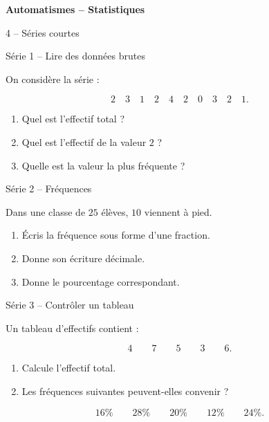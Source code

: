 \documentclass[aspectratio=169,11pt]{beamer}
\newcommand{\serie}[2]{%
\begin{frame}[t]{#1}
\vspace{0.25cm}
#2
\end{frame}
}
\begin{document}
\begin{frame}[plain]
\vfill
\centering
{\Huge\bfseries\color{TitreC} Automatismes -- Statistiques\par}
\vspace{0.5cm}
{\Large\color{SavoirC}4\ieme{} -- Séries courtes}
\vfill
\end{frame}

\serie{Série 1 -- Lire des données brutes}{

On considère la série :

\[
2\quad3\quad1\quad2\quad4\quad2\quad0\quad3\quad2\quad1.
\]

\begin{enumerate}
  \item Quel est l'effectif total ?
  \item Quel est l'effectif de la valeur \(2\) ?
  \item Quelle est la valeur la plus fréquente ?
\end{enumerate}
}

\serie{Série 2 -- Fréquences}{

Dans une classe de \(25\) élèves, \(10\) viennent à pied.

\begin{enumerate}
  \item Écris la fréquence sous forme d'une fraction.
  \item Donne son écriture décimale.
  \item Donne le pourcentage correspondant.
\end{enumerate}
}

\serie{Série 3 -- Contrôler un tableau}{

Un tableau d'effectifs contient :

\[
4\qquad7\qquad5\qquad3\qquad6.
\]

\begin{enumerate}
  \item Calcule l'effectif total.
  \item Les fréquences suivantes peuvent-elles convenir ?
\end{enumerate}

\[
16\%\qquad28\%\qquad20\%\qquad12\%\qquad24\%.
\]
}
\end{document}

